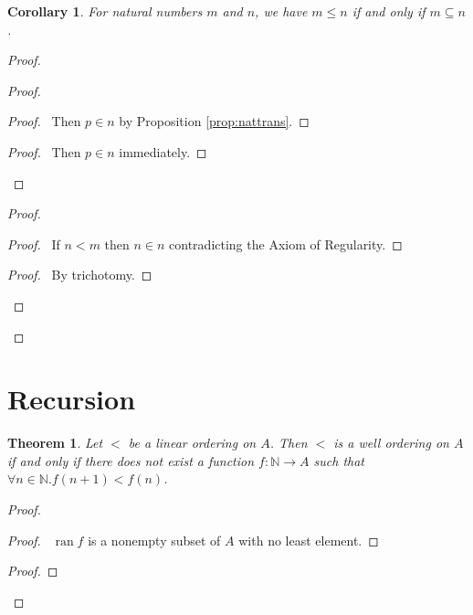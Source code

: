 \documentclass{book}
\let\qed\relax
\newtheorem{cor}{Corollary}[ax]
\newtheorem{thm}[ax]{Theorem}
\theoremstyle{definition}
\newcommand{\ran}{\ensuremath{\operatorname{ran}}}
\begin{document}
\begin{cor}
For natural numbers $m$ and $n$, we have $m \leq n$ if and only if $m \subseteq n$.
\end{cor}

\begin{proof}
	\pf
	\begin{proof}
		\begin{proof}
			\pf\ Then $p \in n$ by Proposition \ref{prop:nattrans}.
		\end{proof}
		\begin{proof}
			\pf\ Then $p \in n$ immediately.
		\end{proof}
	\end{proof}
	\begin{proof}
		\begin{proof}
			\pf\ If $n < m$ then $n \in n$ contradicting the Axiom of Regularity.
		\end{proof}
		\begin{proof}
			\pf\ By trichotomy.
		\end{proof}
	\end{proof}
	\qed
\end{proof}

\section{Recursion}

\begin{thm}
Let $<$ be a linear ordering on $A$. Then $<$ is a well ordering on $A$ if and only if there does not exist a function $f : \mathbb{N} \rightarrow A$ such that $\forall n \in \mathbb{N}. f(n+1) < f(n)$.
\end{thm}

\begin{proof}
\pf
{}
\begin{proof}
	\pf\ $\ran f$ is a nonempty subset of $A$ with no least element.
\end{proof}
\begin{proof}
\end{proof}
\qed
\end{proof}
\end{document}
